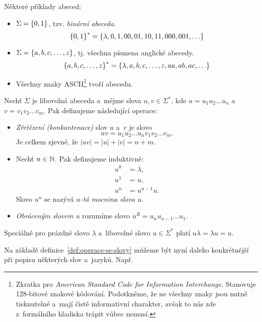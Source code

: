 \begin{example}
    Některé příklady abeced:
    \begin{itemize}
        \item $\Sigma=\left\{0,1\right\}$, tzv. \emph{binární abeceda}.
        \[\left\{0,1\right\}^*=\left\{\lambda,0,1,00,01,10,11,000,001,\ldots\right\}\]
        \item $\Sigma=\left\{a,b,c,\ldots,z\right\}$, tj. všechna písmena anglické abecedy.
        \[\left\{a,b,c,\ldots,z\right\}^*=\left\{\lambda,a,b,c,\ldots,z,aa,ab,ac,\ldots\right\}\]
        \item Všechny znaky ASCII\footnote{Zkratka pro \emph{American Standard Code for Information Interchange}. Stanovuje 128-bitové znakové kódování. Podotkněme, že ne všechny znaky jsou nutně tisknutelné a~mají čistě informativní charakter, avšak to nás zde z~formálního hladiska trápit vůbec nemusí.} tvoří abecedu.
    \end{itemize}
\end{example}
\begin{definition}\label{def:operace-se-slovy}
    Nechť $\Sigma$ je libovolná abeceda a~mějme slova $u,v\in\Sigma^*$, kde $u=u_1u_2\ldots u_n$ a~$v=v_1v_2\ldots v_m$. Pak definujeme následující operace:
    \begin{itemize}
        \item \emph{Zřetězení (konkantenace)} slov $u$ a~$v$ je slovo
        \[uv=u_1u_2\ldots u_nv_1v_2\ldots v_m.\]
        Je celkem zjevné, že $|uv|=|u|+|v|=n+m$.
        \item Nechť $n\in\mathbb{N}$. Pak definujeme induktivně:
        \begin{align*}
            u^0&=\lambda,\\
            u^1&=u,\\
            u^n&=u^{n-1}u.
        \end{align*}
        Slovo $u^n$ se nazývá \emph{$n$-tá mocnina slova} $u$.
        \item \emph{Obráceným slovem $u$} rozumíme slovo $u^R=u_nu_{n-1}\ldots u_1$.
    \end{itemize}
\end{definition}
\begin{remark}
    Speciálně pro prázdné slovo $\lambda$ a~libovolné slovo $u\in\Sigma^*$ platí $u\lambda=\lambda u=u$.
\end{remark}
Na základě definice~\ref{def:operace-se-slovy} můžeme být nyní daleko konkrétnější při popisu některých slov a~jazyků. Např.
